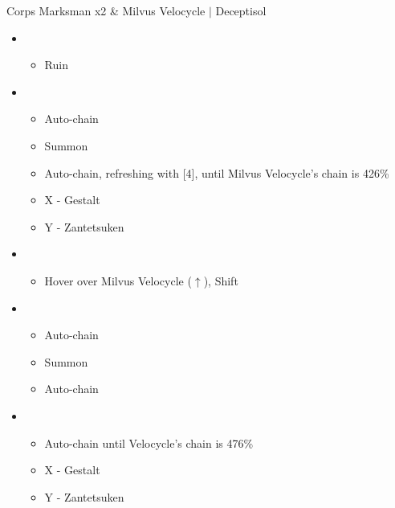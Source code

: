 \begin{battle}{Corps Marksman x2 \& Milvus Velocycle $|$ Deceptisol}
\begin{multicols}{2}
\begin{itemize}
    \item \first
    \begin{itemize}
        \item Ruin
    \end{itemize}
    \item \fifth
    \begin{itemize}
        \item Auto-chain
        \item Summon
        \item Auto-chain, refreshing with [4], until Milvus Velocycle's chain is 426\%
        \item X - Gestalt
        \item Y - Zantetsuken
    \end{itemize}
    \columnbreak
    \item \first
    \begin{itemize}
    		\item Hover over Milvus Velocycle ($\uparrow$), Shift
    	\end{itemize}
    	\item \fifth
    	\begin{itemize}
    		\item Auto-chain
    		\item Summon
    		\item Auto-chain
    	\end{itemize}
    	\item \fourth
    	\begin{itemize}
    		\item Auto-chain until Velocycle's chain is 476\%
    		\item X - Gestalt
    		\item Y - Zantetsuken
    	\end{itemize}
\end{itemize}
\end{multicols}
\end{battle}
